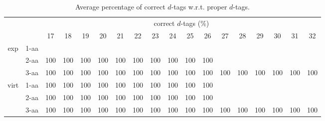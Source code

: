 \begin{table}[h]\tiny
\vspace{3mm}
{\centering
\begin{center}
\begin{tabular}{|c|l|c|c|c|c|c|c|c|c|c|c|c|c|c|c|c|c|}
  \hline
  \multicolumn{2}{|c|}{ } & \multicolumn{ 16 }{|c|}{ correct $d$-tags (\%)} \\
  \cline{3- 18}
  \multicolumn{2}{|c|}{ }  & 17 & 18 & 19 & 20 & 21 & 22 & 23 & 24 & 25 & 26 & 27 & 28 & 29 & 30 & 31 & 32\\
  \hline
  \multirow{3}{*}{exp}
&  1-aa  &  &  &  &  &  &  &  &  &  &  &  &  &  &  &  & \\
&  2-aa  & 100 & 100 & 100 & 100 & 100 & 100 & 100 & 100 & 100 & 100 &  &  &  &  &  & \\
&  3-aa  & 100 & 100 & 100 & 100 & 100 & 100 & 100 & 100 & 100 & 100 & 100 & 100 & 100 & 100 & 100 & 100\\
 \hline
  \multirow{3}{*}{virt} 
&  1-aa  & 100 & 100 & 100 & 100 & 100 & 100 & 100 & 100 & 100 & 100 &  &  &  &  &  & \\
&  2-aa  & 100 & 100 & 100 & 100 & 100 & 100 & 100 & 100 & 100 & 100 &  &  &  &  &  & \\
&  3-aa  & 100 & 100 & 100 & 100 & 100 & 100 & 100 & 100 & 100 & 100 & 100 & 100 & 100 & 100 & 100 & 100\\
 \hline
\end{tabular}
\end{center}
\par}
\centering

\caption{ Average percentage of correct $d$-tags w.r.t. proper $d$-tags.}

\vspace{3mm}
\label{table:correct-vs-proper-d-tags}
\end{table}
